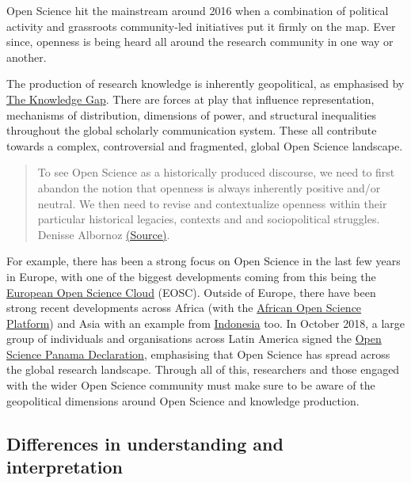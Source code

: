\documentclass[]{book}
\begin{document}
Open Science hit the mainstream around 2016 when a combination of political activity and grassroots community-led initiatives put it firmly on the map. Ever since, openness is being heard all around the research community in one way or another.

The production of research knowledge is inherently geopolitical, as emphasised by \href{http://knowledgegap.org/}{The Knowledge Gap}. There are forces at play that influence representation, mechanisms of distribution, dimensions of power, and structural inequalities throughout the global scholarly communication system. These all contribute towards a complex, controversial and fragmented, global Open Science landscape.

\begin{quote}
To see Open Science as a historically produced discourse, we need to first abandon the notion that openness is always inherently positive and/or neutral. We then need to revise and contextualize openness within their particular historical legacies, contexts and and sociopolitical struggles. Denisse Albornoz \href{https://medium.com/@denalbz/power-and-inequality-in-open-science-discourses-9d425b0c2b63}{(Source)}.
\end{quote}

For example, there has been a strong focus on Open Science in the last few years in Europe, with one of the biggest developments coming from this being the \href{http://ec.europa.eu/research/openscience/index.cfm?pg=open-science-cloud}{European Open Science Cloud} (EOSC). Outside of Europe, there have been strong recent developments across Africa (with the \href{http://africanopenscience.org.za/}{African Open Science Platform}) and Asia with an example from \href{https://blogs.openaire.eu/?p=3105}{Indonesia} too. In October 2018, a large group of individuals and organisations across Latin America signed the \href{http://openaccessweek.org/profiles/blogs/open-scicence-panama-declaration-latin-america-going-beyond-open}{Open Science Panama Declaration}, emphasising that Open Science has spread across the global research landscape. Through all of this, researchers and those engaged with the wider Open Science community must make sure to be aware of the geopolitical dimensions around Open Science and knowledge production.

\hypertarget{differences-in-understanding-and-interpretation}{%
\subsection{Differences in understanding and interpretation }\label{differences-in-understanding-and-interpretation}}
\end{document}
